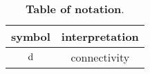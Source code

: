 \begin{table}[h]
\begin{center}
\begin{tabular}{ c || c }
\hline
symbol & interpretation\\
\hline
$\mathrm{d}$ & connectivity\\
\end{tabular}
\end{center}
\caption{{\bf Table of notation}.}\label{tab:notation}
\end{table}

